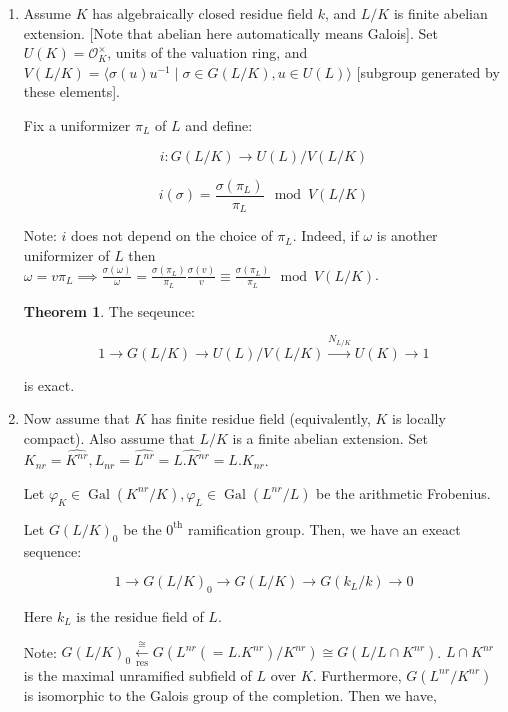\documentclass{article}
\theoremstyle{definition}
\newtheorem{theorem}{Theorem}
\numberwithin{theorem}{subsection}
\begin{document}
    \begin{enumerate}[label=\arabic*)]
        \item Assume \(K\) has algebraically closed residue field \(k\), and \(L / K\) is finite abelian extension. [Note that abelian here automatically means Galois]. Set \(U(K) = \mathcal{O}_K^\times\), units of the valuation ring, and \(V(L / K) = \langle \sigma (u) u ^{-1} \mid \sigma \in G(L / K), u \in U(L) \rangle\) [subgroup generated by these elements].
        
        Fix a uniformizer \(\pi_L\) of \(L\) and define:

        \[
            i: G(L / K) \to U(L) / V(L / K)
        \]

        \[
            i(\sigma) = \frac{\sigma(\pi_L)}{\pi_L} \mod V(L / K)
        \]

        Note: \(i\) does not depend on the choice of \(\pi_L\). Indeed, if \(\omega\) is another uniformizer of \(L\) then \(\omega = v \pi_L \implies \frac{\sigma(\omega)}{\omega} = \frac{\sigma(\pi_L)}{\pi_L} \frac{\sigma(v)}{v} \equiv \frac{\sigma(\pi_L)}{\pi_L} \mod V(L / K)\). 

        \begin{theorem}
            The seqeunce:
    
            \[
                1 \to G(L / K) \to U(L) / V(L / K) \xrightarrow{N_{L / K}} U(K) \to 1
            \]
    
            is exact.
        \end{theorem}
        
        \item Now assume that \(K\) has finite residue field (equivalently, \(K\) is locally compact). Also assume that \(L / K\) is a finite abelian extension. Set \(K_{nr} = \widehat{K^{nr}}, L_{nr} = \widehat{L^{nr}} = \widehat{L.K^{nr}} = L . K_{nr}\).
        
        Let \(\varphi_K \in \operatorname{Gal}(K^{nr} / K), \varphi_L \in \operatorname{Gal} (L^{nr} / L)\) be the arithmetic Frobenius. 

        Let \(G(L / K)_0\) be the \(0^{\text{th}}\) ramification group. Then, we have an exeact sequence:

        \[
            1 \to G(L / K)_0 \to G(L / K) \to G(k_L / k) \to 0
        \]

        Here \(k_L\) is the residue field of \(L\).

        Note: \(G(L / K)_0 \xleftarrow[\text{res}]{\cong} G(L^{nr} (= L.K^{nr}) / K^{nr}) \cong G(L / L\cap K^{nr})\). \(L \cap K^{nr}\) is the maximal unramified subfield of \(L\) over \(K\). Furthermore, \(G(L^{nr} / K^{nr})\) is isomorphic to the Galois group of the completion. Then we have,


\end{enumerate}
\end{document}
